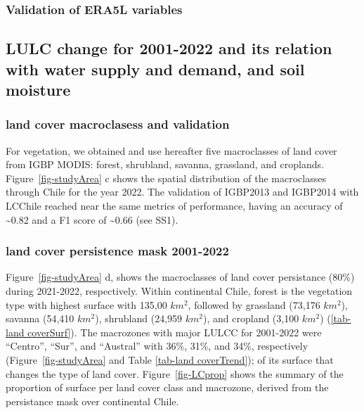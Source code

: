 \documentclass[
  authoryear,
  preprint,
  3p,
  onecolumn]{elsarticle}
\begin{document}
\hypertarget{validation-of-era5l-variables-1}{%
\subsubsection{Validation of ERA5L
variables}\label{validation-of-era5l-variables-1}}

\hypertarget{lulc-change-for-2001-2022-and-its-relation-with-water-supply-and-demand-and-soil-moisture}{%
\subsection{LULC change for 2001-2022 and its relation with water supply
and demand, and soil
moisture}\label{lulc-change-for-2001-2022-and-its-relation-with-water-supply-and-demand-and-soil-moisture}}

\hypertarget{land-cover-macroclasess-and-validation-1}{%
\subsubsection{land cover macroclasess and
validation}\label{land-cover-macroclasess-and-validation-1}}

For vegetation, we obtained and use hereafter five macroclasses of land
cover from IGBP MODIS: forest, shrubland, savanna, grassland, and
croplands. Figure~\ref{fig-studyArea} c shows the spatial distribution
of the macroclasses through Chile for the year 2022. The validation of
IGBP2013 and IGBP2014 with LCChile reached near the same metrics of
performance, having an accuracy of \textasciitilde0.82 and a F1 score of
\textasciitilde0.66 (see SS1).

\hypertarget{land-cover-persistence-mask-2001-2022-1}{%
\subsubsection{land cover persistence mask
2001-2022}\label{land-cover-persistence-mask-2001-2022-1}}

Figure~\ref{fig-studyArea} d, shows the macroclasses of land cover
persistance (80\%) during 2021-2022, respectively. Within continental
Chile, forest is the vegetation type with highest surface with 135,00
\(km^2\), followed by grassland (73,176 \(km^2\)), savanna (54,410
\(km^2\)), shrubland (24,959 \(km^2\)), and cropland (3,100 \(km^2\))
(\ref{tab-land coverSurf}). The macrozones with major LULCC for
2001-2022 were ``Centro'', ``Sur'', and ``Austral'' with 36\%, 31\%, and
34\%, respectively (Figure~\ref{fig-studyArea} and Table
\ref{tab-land coverTrend}); of its surface that changes the type of land
cover. Figure~\ref{fig-LCprop} shows the summary of the proportion of
surface per land cover class and macrozone, derived from the persistance
mask over continental Chile.
\end{document}
